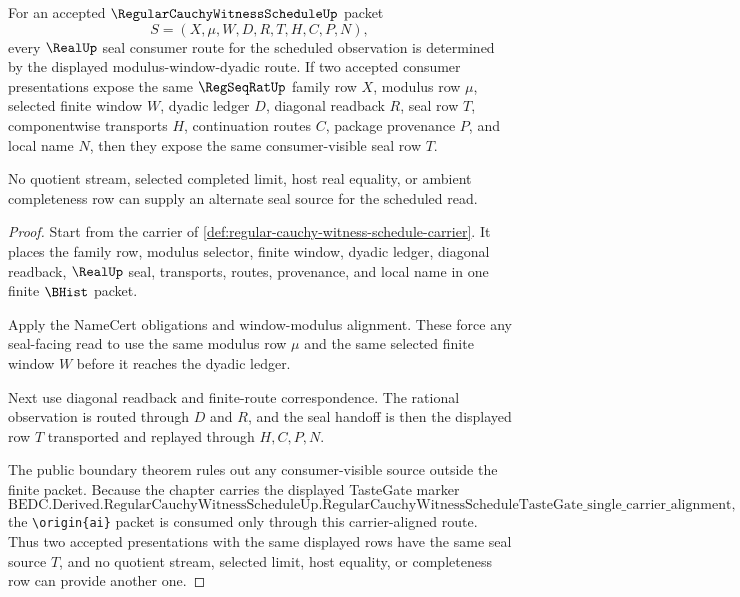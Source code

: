 \begin{theorem}
\label{thm:regular-cauchy-witness-schedule-seal-source-determinacy}
For an accepted $\RegularCauchyWitnessScheduleUp$ packet
$$
S=(X,\mu,W,D,R,T,H,C,P,N),
$$
every $\RealUp$ seal consumer route for the scheduled observation is determined by the displayed modulus-window-dyadic route. If two accepted consumer presentations expose the same $\RegSeqRatUp$ family row $X$, modulus row $\mu$, selected finite window $W$, dyadic ledger $D$, diagonal readback $R$, seal row $T$, componentwise transports $H$, continuation routes $C$, package provenance $P$, and local name $N$, then they expose the same consumer-visible seal row $T$.

No quotient stream, selected completed limit, host real equality, or ambient completeness row can supply an alternate seal source for the scheduled read.
\end{theorem}
\begin{proof}
Start from the carrier of \autoref{def:regular-cauchy-witness-schedule-carrier}. It places the family row, modulus selector, finite window, dyadic ledger, diagonal readback, $\RealUp$ seal, transports, routes, provenance, and local name in one finite $\BHist$ packet.

Apply the NameCert obligations and window-modulus alignment. These force any seal-facing read to use the same modulus row $\mu$ and the same selected finite window $W$ before it reaches the dyadic ledger.

Next use diagonal readback and finite-route correspondence. The rational observation is routed through $D$ and $R$, and the seal handoff is then the displayed row $T$ transported and replayed through $H,C,P,N$.

The public boundary theorem rules out any consumer-visible source outside the finite packet. Because the chapter carries the displayed TasteGate marker
$$
\text{BEDC.Derived.RegularCauchyWitnessScheduleUp.RegularCauchyWitnessScheduleTasteGate\_single\_carrier\_alignment},
$$
the \texttt{\textbackslash origin\{ai\}} packet is consumed only through this carrier-aligned route. Thus two accepted presentations with the same displayed rows have the same seal source $T$, and no quotient stream, selected limit, host equality, or completeness row can provide another one.
\end{proof}

